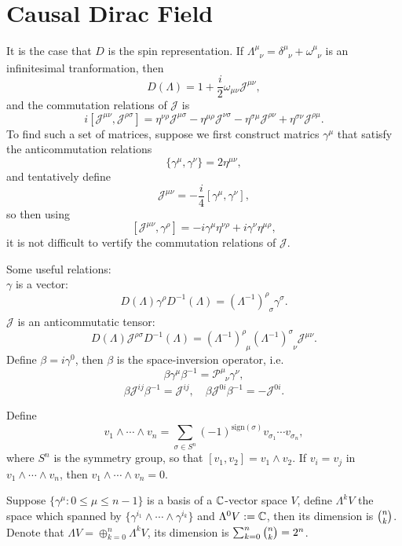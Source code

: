 \documentclass[8pt]{book}
\begin{document}
\section{Causal Dirac Field}
It is the case that $D$ is the spin representation. If $\Lambda^\mu_{\phantom{\mu}\nu}=\delta^\mu_{\phantom{\mu}\nu}+\omega^\mu_{\phantom{\mu}\nu}$ is an infinitesimal tranformation, then
\[
	D(\Lambda)=1+\frac{i}{2}\omega_{\mu\nu} \mathscr{J}^{\mu\nu},
\]
and the commutation relations of $\mathscr{J}$ is
\[
	i\left[\mathscr{J}^{\mu\nu},\mathscr{J}^{\rho \sigma}\right]=
	\eta^{\nu\rho}\mathscr{J}^{\mu \sigma}-
	\eta^{\mu \rho}\mathscr{J}^{\nu \sigma}-
	\eta^{\sigma\mu}\mathscr{J}^{\rho \nu}+
	\eta^{\sigma\nu}\mathscr{J}^{\rho \mu}.
\]
To find such a set of matrices, suppose we first construct matrics $\gamma^\mu$ that satisfy the anticommutation relations
\[
	\{\gamma^\mu,\gamma^\nu\}=2\eta^{\mu\nu},
\]
and tentatively define
\[
	\mathscr{J}^{\mu\nu}=-\frac{i}{4}[\gamma^\mu,\gamma^\nu],
\]
so then using
\[
	[\mathscr{J}^{\mu\nu},\gamma^\rho]=-i\gamma^\mu \eta^{\nu\rho}+i\gamma^\nu \eta^{\mu\rho},
\]
it is not difficult to vertify the commutation relations of $\mathscr{J}$.

Some useful relations:\\
 $\gamma$ is a vector:
\[
	D(\Lambda)\gamma^\rho D^{-1}(\Lambda)=(\Lambda^{-1})^\rho_{\phantom{\rho}\sigma}\gamma^\sigma.
\]
 $\mathscr{J}$ is an anticommutatic tensor:
\[
	D(\Lambda)\mathscr{J}^{\rho\sigma} D^{-1}(\Lambda)=(\Lambda^{-1})^\rho_{\phantom{\rho}\mu}(\Lambda^{-1})^\sigma_{\phantom{\sigma}\nu}\mathscr{J}^{\mu\nu}.
\]
 Define $\beta=i\gamma^0$, then $\beta$ is the space-inversion operator, i.e.
\[
	\beta \gamma^\mu \beta^{-1}=\mathscr{P}^\mu_{\phantom{\mu}\nu}\gamma^\nu,
\]
\[
	\beta \mathscr{J}^{ij} \beta^{-1}=\mathscr{J}^{ij}, \quad \beta \mathscr{J}^{0i} \beta^{-1}=-\mathscr{J}^{0i}.
\]

Define
\[
	v_1\wedge \cdots \wedge v_n=\sum_{\sigma\in S^n}(-1)^{\mathrm{sign}(\sigma)}v_{\sigma_1}\cdots v_{\sigma_n},
\]
where $S^n$ is the symmetry group, so that $[v_1,v_2]=v_1\wedge v_2$. If $v_i=v_j$ in $v_1\wedge \cdots \wedge v_n$, then $v_1\wedge \cdots \wedge v_n=0$.

Suppose $\{\gamma^\mu: 0 \leq \mu \leq n-1\}$ is a basis of a $\mathbb{C}$-vector space $V$, define $\Lambda^kV$ the space which spanned by $\{\gamma^{i_1}\wedge \cdots \wedge \gamma^{i_k}\}$ and $\Lambda^0V:=\mathbb{C}$, then its dimension is $\tbinom{n}{k}$. Denote that $\Lambda V=\oplus_{k=0}^n \Lambda^kV$, its dimension is $\sum_{k=0}^{n}\tbinom{n}{k}=2^{n}$.
\end{document}
